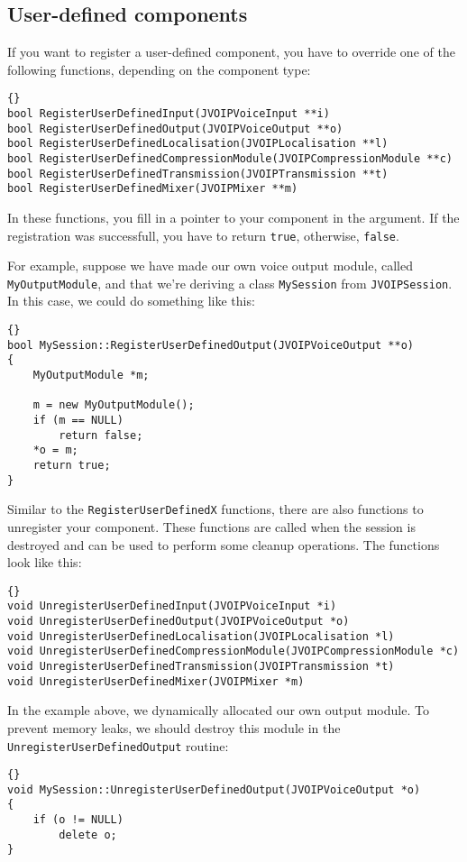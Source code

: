 		\subsection{User-defined components}
		
		If you want to register a user-defined component, you have to override
		one of the following functions, depending on the component type:
		\begin{lstlisting}[frame=tb]{}
bool RegisterUserDefinedInput(JVOIPVoiceInput **i)
bool RegisterUserDefinedOutput(JVOIPVoiceOutput **o)
bool RegisterUserDefinedLocalisation(JVOIPLocalisation **l)
bool RegisterUserDefinedCompressionModule(JVOIPCompressionModule **c)
bool RegisterUserDefinedTransmission(JVOIPTransmission **t)
bool RegisterUserDefinedMixer(JVOIPMixer **m)
		\end{lstlisting}
		
		In these functions, you fill in a pointer to your component in the argument. 
		If the registration was successfull, you have to return {\tt true},
		otherwise, {\tt false}.
		
		For example, suppose we have made our own voice output module, called 
		{\tt My\-Output\-Module}, and that we're deriving a class {\tt My\-Session}
		from {\tt JVOIP\-Session}. In this case, we could do something like this:
		\begin{lstlisting}[frame=tb]{}
bool MySession::RegisterUserDefinedOutput(JVOIPVoiceOutput **o)
{
	MyOutputModule *m;

	m = new MyOutputModule();
	if (m == NULL)
		return false;
	*o = m;
	return true;
}
		\end{lstlisting}
		
		Similar to the {\tt Register\-User\-DefinedX} functions, there are also functions
		to unregister your component. These functions are called when the session is
		destroyed and can be used to perform some cleanup operations. The functions
		look like this:
		\begin{lstlisting}[frame=tb]{}
void UnregisterUserDefinedInput(JVOIPVoiceInput *i)
void UnregisterUserDefinedOutput(JVOIPVoiceOutput *o)
void UnregisterUserDefinedLocalisation(JVOIPLocalisation *l)
void UnregisterUserDefinedCompressionModule(JVOIPCompressionModule *c)
void UnregisterUserDefinedTransmission(JVOIPTransmission *t)
void UnregisterUserDefinedMixer(JVOIPMixer *m)
		\end{lstlisting}
		
		In the example above, we dynamically allocated our own output module.
		To prevent memory leaks, we should destroy this module in the
		{\tt Unregister\-User\-Defined\-Output} routine:
		\begin{lstlisting}[frame=tb]{}
void MySession::UnregisterUserDefinedOutput(JVOIPVoiceOutput *o)
{
	if (o != NULL)
		delete o;
}
		\end{lstlisting}
		
